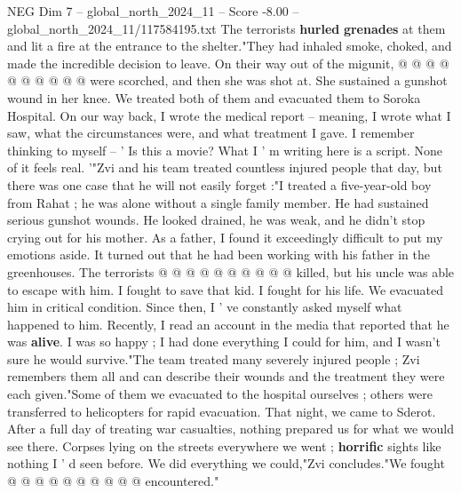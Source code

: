 \begin{textsample}{NEG Dim 7 – global\_north\_2024\_11 – Score -8.00 – global\_north\_2024\_11/117584195.txt}
The terrorists \textbf{hurled} \textbf{grenades} at them and lit a fire at the entrance to the shelter."They had inhaled smoke, choked, and made the incredible decision to leave.
On their way out of the migunit, @ @ @ @ @ @ @ @ @ @ were scorched, and then she was shot at.
She sustained a gunshot wound in her knee.
We treated both of them and evacuated them to Soroka Hospital.
On our way back, I wrote the medical report -- meaning, I wrote what I saw, what the circumstances were, and what treatment I gave.
I remember thinking to myself -- ' Is this a movie?
What I ' m writing here is a script.
None of it feels real. '"Zvi and his team treated countless injured people that day, but there was one case that he will not easily forget :"I treated a five-year-old boy from Rahat ; he was alone without a single family member.
He had sustained serious gunshot wounds.
He looked drained, he was weak, and he didn't stop crying out for his mother.
As a father, I found it exceedingly difficult to put my emotions aside.
It turned out that he had been working with his father in the greenhouses.
The terrorists @ @ @ @ @ @ @ @ @ @ killed, but his uncle was able to escape with him.
I fought to save that kid.
I fought for his life.
We evacuated him in critical condition.
Since then, I ' ve constantly asked myself what happened to him.
Recently, I read an account in the media that reported that he was \textbf{alive}.
I was so happy ; I had done everything I could for him, and I wasn't sure he would survive."The team treated many severely injured people ; Zvi remembers them all and can describe their wounds and the treatment they were each given."Some of them we evacuated to the hospital ourselves ; others were transferred to helicopters for rapid evacuation.
That night, we came to Sderot.
After a full day of treating war casualties, nothing prepared us for what we would see there.
Corpses lying on the streets everywhere we went ; \textbf{horrific} sights like nothing I ' d seen before.
We did everything we could,"Zvi concludes."We fought @ @ @ @ @ @ @ @ @ @ encountered."

\end{textsample}
